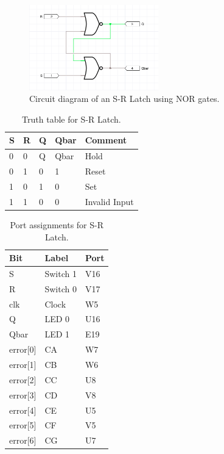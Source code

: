 \documentclass[11pt]{article}
\begin{document}
\begin{figure}[H]
\begin{center}
	\includegraphics[width=0.5\textwidth]{./images/sr_diagram.png}
	\caption{\label{fig:sr_circuit_diagram}Circuit diagram of an S-R Latch using NOR gates.}
\end{center}
\end{figure}

\begin{table}[H]
\begin{center}
\begin{tabular}{| l | l | l | l | l |}
	\hline
	S & R & Q & Qbar & Comment \\ \hline
	0 & 0 & Q & Qbar & Hold \\ \hline
	0 & 1 & 0 & 1 & Reset \\ \hline
	1 & 0 & 1 & 0 & Set \\ \hline
	1 & 1 & 0 & 0 & Invalid Input \\ \hline
\end{tabular}
\caption{\label{tab:srTruthTable}Truth table for S-R Latch.}
\end{center}
\end{table}

\begin{table}[H]
\begin{center}
\begin{tabular}{| l | l | l |}
	\hline
	Bit & Label & Port \\ \hline
	S & Switch 1 & V16 \\ \hline
	R & Switch 0 & V17 \\ \hline
	clk & Clock & W5 \\ \hline
	Q & LED 0 & U16 \\ \hline
	Qbar & LED 1 & E19 \\ \hline
	error[0] & CA & W7 \\ \hline
	error[1] & CB & W6 \\ \hline
	error[2] & CC & U8 \\ \hline
	error[3] & CD & V8 \\ \hline
	error[4] & CE & U5 \\ \hline
	error[5] & CF & V5 \\ \hline
	error[6] & CG & U7 \\ \hline
\end{tabular}
\caption{\label{tab:srPorts}Port assignments for S-R Latch.}
\end{center}
\end{table}
\end{document}

